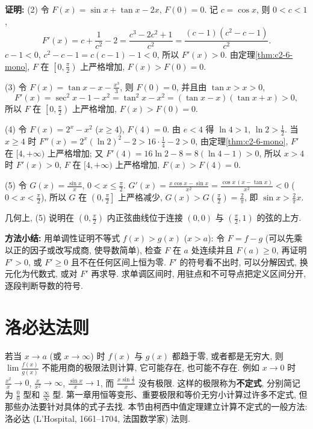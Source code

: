 \documentclass[UTF8,openany]{ctexbook}
\theoremstyle{chinesetextbook}
\newenvironment{cnproof}{\par\indent\textbf{证明:} \ignorespaces}{\par}
\begin{document}
\begin{cnproof}
(2) 令 $F(x)=\sin x+\tan x-2x$, $F(0)=0$. 记 $c=\cos x$, 则 $0<c<1$,
\[
F'(x)=c+\frac1{c^2}-2=\frac{c^3-2c^2+1}{c^2}=\frac{(c-1)(c^2-c-1)}{c^2}.
\]
$c-1<0$, $c^2-c-1=c(c-1)-1<0$, 所以 $F'(x)>0$. 由定理\ref{thm:c2-6-mono}, $F$ 在 $\displaystyle\left[0,\frac\pi2\right)$ 上严格增加, $F(x)>F(0)=0$.

(3) 令 $\displaystyle F(x)=\tan x-x-\frac{x^3}3$, 则 $F(0)=0$, 并且由 $\tan x>x>0$,
\[
F'(x)=\sec^2x-1-x^2=\tan^2x-x^2=(\tan x-x)(\tan x+x)>0,
\]
所以 $F$ 在 $\displaystyle\left[0,\frac\pi2\right)$ 上严格增加, $F(x)>F(0)=0$.

(4) 令 $F(x)=2^x-x^2$ ($x\ge4$), $F(4)=0$. 由 $e<4$ 得 $\ln4>1$, $\displaystyle\ln2>\frac12$. 当 $x\ge4$ 时 $\displaystyle F''(x)=2^x(\ln2)^2-2>16\cdot\frac14-2>0$, 由定理\ref{thm:c2-6-mono}, $F'$ 在 $[4,+\infty)$ 上严格增加; 又 $F'(4)=16\ln2-8=8(\ln4-1)>0$, 所以 $x>4$ 时 $F'(x)>0$, $F$ 在 $[4,+\infty)$ 上严格增加, $F(x)>F(4)=0$.

(5) 令 $\displaystyle G(x)=\frac{\sin x}x$, $\displaystyle0<x\le\frac\pi2$. $\displaystyle G'(x)=\frac{x\cos x-\sin x}{x^2}=\frac{\cos x\,(x-\tan x)}{x^2}<0$ ($\displaystyle0<x<\frac\pi2$), 所以 $G$ 在 $\displaystyle\left(0,\frac\pi2\right]$ 上严格减少, $\displaystyle G(x)>G\left(\frac\pi2\right)=\frac2\pi$, 即 $\displaystyle\sin x>\frac2\pi x$.
\end{cnproof}
几何上, (5) 说明在 $\displaystyle\left(0,\frac\pi2\right)$ 内正弦曲线位于连接 $(0,0)$ 与 $\displaystyle\left(\frac\pi2,1\right)$ 的弦的上方.
\par\indent\textbf{方法小结:} 用单调性证明不等式 $f(x)>g(x)$ ($x>a$): 令 $F=f-g$ (可以先乘以正的因子或改写成商, 使导数简单), 检查 $F$ 在 $a$ 处连续并且 $F(a)\ge0$, 再证明 $F'>0$, 或 $F'\ge0$ 且不在任何区间上恒为零. $F'$ 的符号看不出时, 可以分解因式, 换元化为代数式, 或对 $F'$ 再求导. 求单调区间时, 用驻点和不可导点把定义区间分开, 逐段判断导数的符号.
\section{洛必达法则}
若当 $x\to a$ (或 $x\to\infty$) 时 $f(x)$ 与 $g(x)$ 都趋于零, 或者都是无穷大, 则 $\displaystyle\lim\frac{f(x)}{g(x)}$ 不能用商的极限法则计算, 它可能存在, 也可能不存在. 例如 $x\to0$ 时 $\displaystyle\frac{x^2}x\to0$, $\displaystyle\frac x{x^2}\to\infty$, $\displaystyle\frac{\sin x}x\to1$, 而 $\displaystyle\frac{x\sin\frac1x}x$ 没有极限. 这样的极限称为\textbf{不定式}, 分别简记为 $\displaystyle\frac00$ 型和 $\displaystyle\frac\infty\infty$ 型. 第一章用恒等变形、重要极限和等价无穷小计算过许多不定式, 但那些办法要针对具体的式子去找. 本节由柯西中值定理建立计算不定式的一般方法: 洛必达 (L'Hospital, 1661--1704, 法国数学家) 法则.
\end{document}
